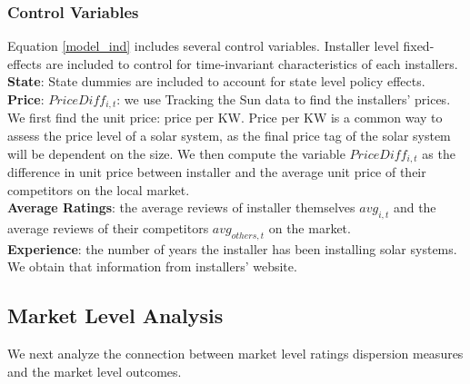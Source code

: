 \documentclass[msom,blindrev]{informs3}
\begin{document}
\subsubsection{Control Variables\\}
Equation \ref{model_ind} includes several control variables. Installer level fixed-effects are included to control for time-invariant characteristics of each installers. \\	\textbf{State}: State dummies are included to account for state level policy effects. \\
\textbf{Price}:   $PriceDiff_{i,t}$: we use Tracking the Sun data to find the installers' prices. We first find the unit price: price per KW. Price per KW is a common way to assess the price level of a solar system, as the final price tag of the solar system will be dependent on the size. We then compute the variable $PriceDiff_{i,t}$ as the difference in unit price between installer and the average unit price of their competitors on the local market. \\
\textbf{Average Ratings}: the average reviews of installer themselves $avg_{i,t}$ and the average reviews of their competitors $avg_{others,t}$ on the market. \\
\textbf{Experience}: the number of years the installer has been installing solar systems. We obtain that information from installers' website. 

\subsection{Market Level Analysis}
We next analyze the connection between market level ratings dispersion measures and the market level outcomes. \\
 
\end{document}
